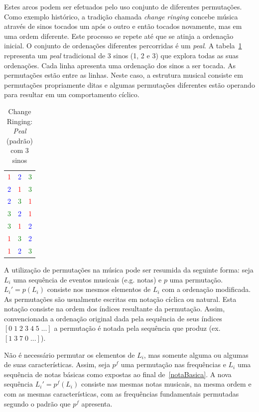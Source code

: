 Estes arcos podem ser efetuados pelo uso conjunto de diferentes permutações. Como exemplo
histórico, a tradição chamada \emph{change ringing} concebe música através de sinos tocados um após o outro e então tocados novamente, mas em uma ordem diferente. Este processo se repete até que se atinja a ordenação inicial. O conjunto de ordenações diferentes percorridas é um \emph{peal}. A tabela~\ref{tab:change} representa um \emph{peal} tradicional de 3 sinos (1, 2 e 3) que explora todas as suas ordenações. Cada linha apresenta uma ordenação dos sinos a ser tocada. As permutações estão entre as linhas.
Neste caso, a estrutura musical consiste em permutações propriamente ditas e algumas permutações diferentes estão operando para resultar em um comportamento cíclico.

\begin{table}[htpq!]
\centering
\begin{tabular}{l c r}
\textcolor{red}{1} & \textcolor{blue}{2} & \textcolor{green}{3} \\
\textcolor{blue}{2} & \textcolor{red}{1} & \textcolor{green}{3} \\
\textcolor{blue}{2} & \textcolor{green}{3} & \textcolor{red}{1} \\
\textcolor{green}{3} & \textcolor{blue}{2} & \textcolor{red}{1} \\
\textcolor{green}{3} & \textcolor{red}{1} & \textcolor{blue}{2} \\
\textcolor{red}{1} & \textcolor{green}{3} & \textcolor{blue}{2} \\
\textcolor{red}{1} & \textcolor{blue}{2} & \textcolor{green}{3}
\end{tabular}
\caption{Change Ringing: \emph{Peal} (padrão) com 3 sinos}
\label{tab:change}
\end{table}


A utilização de permutações na música pode ser resumida da seguinte forma:
seja $L_i$ uma sequência de eventos musicais (e.g. notas) e $p$ uma permutação.
$L_i'=p(L_i)$ consiste nos mesmos elementos de $L_i$ com a ordenação
modificada.
As permutações são usualmente escritas em notação cíclica ou natural. 
Esta notação consiste na ordem dos índices 
resultante da permutação. Assim,
convencionada a ordenação original dada pela sequência de seus índices $[0\;1\;2\;3\;4\;5\;...]$ a permutação é notada pela sequência que produz (ex. $[1\;3\;7\;0\;...]$).

Não é necessário permutar os elementos de $L_i$, mas somente
alguma ou algumas de suas características. Assim, seja $p^f$ uma permutação 
nas frequências e $L_i$ uma sequência de notas básicas como expostas
ao final de~\ref{notaBasica}. A nova sequência $L_i'=p^f(L_i)$ consiste nas mesmas
notas musicais, na mesma ordem e com as mesmas características, com as frequências fundamentais permutadas segundo o padrão que $p^f$ apresenta.

